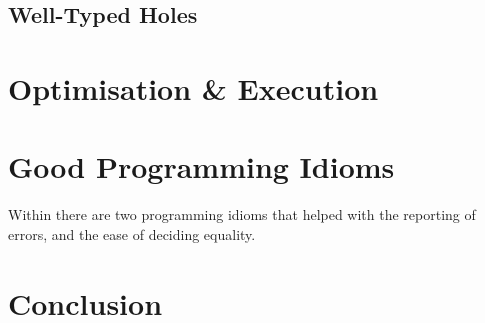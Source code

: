 \documentclass[%
draft, %
a4paper,
UKenglish,
cleveref,
autoref,
thm-restate,
pdfa
]{oasics-v2021}
\begin{document}





\subsection{Well-Typed Holes}
\label{sec:design:holes}


\section{Optimisation \& Execution}
\label{sec:compiler}


\section{Good Programming Idioms}
\label{sec:idioms}

Within \Velo{} there are two programming idioms that helped
with the reporting of errors, and the ease of deciding equality.




\section{Conclusion}
\label{sec:conclusion}



\end{document}
